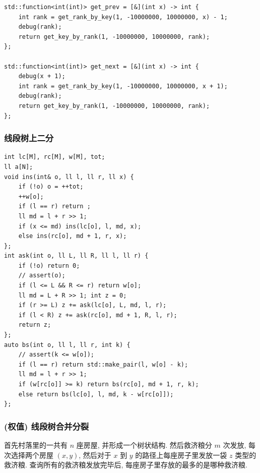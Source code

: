 \documentclass[UTF8, a4paper, titlepage, twoside]{ctexart}
\begin{document}
\begin{lstlisting}[style=cpp]
std::function<int(int)> get_prev = [&](int x) -> int {
    int rank = get_rank_by_key(1, -10000000, 10000000, x) - 1;
    debug(rank);
    return get_key_by_rank(1, -10000000, 10000000, rank);
};

std::function<int(int)> get_next = [&](int x) -> int {
    debug(x + 1);
    int rank = get_rank_by_key(1, -10000000, 10000000, x + 1);
    debug(rank);
    return get_key_by_rank(1, -10000000, 10000000, rank);
};
\end{lstlisting}

\subsubsection*{ 线段树上二分 }
\begin{lstlisting}[style=cpp]
int lc[M], rc[M], w[M], tot;
ll a[N];
void ins(int& o, ll l, ll r, ll x) {
    if (!o) o = ++tot;
    ++w[o];
    if (l == r) return ;
    ll md = l + r >> 1;
    if (x <= md) ins(lc[o], l, md, x);
    else ins(rc[o], md + 1, r, x);
};
int ask(int o, ll L, ll R, ll l, ll r) {
    if (!o) return 0;
    // assert(o);
    if (l <= L && R <= r) return w[o];
    ll md = L + R >> 1; int z = 0;
    if (r >= L) z += ask(lc[o], L, md, l, r);
    if (l < R) z += ask(rc[o], md + 1, R, l, r);
    return z;
};
auto bs(int o, ll l, ll r, int k) {
    // assert(k <= w[o]);
    if (l == r) return std::make_pair(l, w[o] - k);
    ll md = l + r >> 1;
    if (w[rc[o]] >= k) return bs(rc[o], md + 1, r, k);
    else return bs(lc[o], l, md, k - w[rc[o]]);
};
\end{lstlisting}


\subsubsection*{ (权值) 线段树合并分裂 }
首先村落里的一共有 \(n\) 座房屋, 并形成一个树状结构. 然后救济粮分 \(m\) 次发放, 每次选择两个房屋 \((x,y)\), 然后对于 \(x\) 到 \(y\) 的路径上每座房子里发放一袋 \(z\) 类型的救济粮.
查询所有的救济粮发放完毕后, 每座房子里存放的最多的是哪种救济粮.
\end{document}

